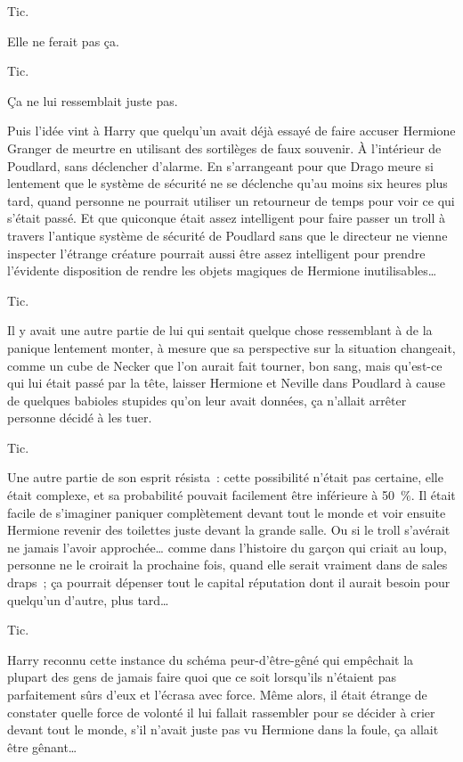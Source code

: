 Tic.

Elle ne ferait pas ça.

Tic.

Ça ne lui ressemblait juste pas.

Puis l'idée vint à Harry que quelqu'un avait déjà essayé de faire accuser Hermione Granger de meurtre en utilisant des sortilèges de faux souvenir.
À l'intérieur de Poudlard, sans déclencher d'alarme.
En s'arrangeant pour que Drago meure si lentement que le système de sécurité ne se déclenche qu'au moins six heures plus tard, quand personne ne pourrait utiliser un retourneur de temps pour voir ce qui s'était passé.
Et que quiconque était assez intelligent pour faire passer un troll à travers l'antique système de sécurité de Poudlard sans que le directeur ne vienne inspecter l'étrange créature pourrait aussi être assez intelligent pour prendre l'évidente disposition de rendre les objets magiques de Hermione inutilisables…

Tic.

Il y avait une autre partie de lui qui sentait quelque chose ressemblant à de la panique lentement monter, à mesure que sa perspective sur la situation changeait, comme un cube de Necker que l'on aurait fait tourner, bon sang, mais qu'est-ce qui lui était passé par la tête, laisser Hermione et Neville dans Poudlard à cause de quelques babioles stupides qu'on leur avait données, ça n'allait arrêter personne décidé à les tuer.

Tic.

Une autre partie de son esprit résista~: cette possibilité n'était pas certaine, elle était complexe, et sa probabilité pouvait facilement être inférieure à 50~\%.
Il était facile de s'imaginer paniquer complètement devant tout le monde et voir ensuite Hermione revenir des toilettes juste devant la grande salle.
Ou si le troll s'avérait ne jamais l'avoir approchée… comme dans l'histoire du garçon qui criait au loup, personne ne le croirait la prochaine fois, quand elle serait vraiment dans de sales draps~; ça pourrait dépenser tout le capital réputation dont il aurait besoin pour quelqu'un d'autre, plus tard…

Tic.

Harry reconnu cette instance du schéma peur-d'être-gêné qui empêchait la plupart des gens de jamais faire quoi que ce soit lorsqu'ils n'étaient pas parfaitement sûrs d'eux et l'écrasa avec force.
Même alors, il était étrange de constater quelle force de volonté il lui fallait rassembler pour se décider à crier devant tout le monde, s'il n'avait juste pas vu Hermione dans la foule, ça allait être gênant…

